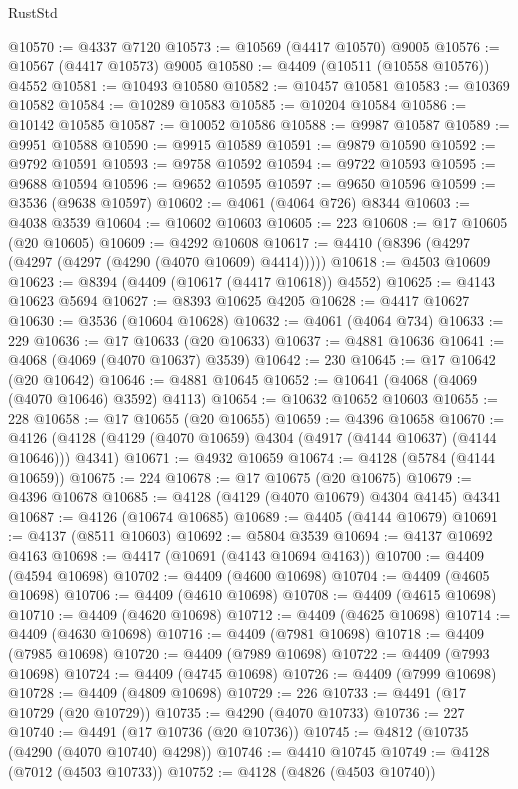 \begin{lexlean}{RustStd}
\begin{coremodule}
@10570 := @4337 @7120
@10573 := @10569 (@4417 @10570) @9005
@10576 := @10567 (@4417 @10573) @9005
@10580 := @4409 (@10511 (@10558 @10576)) @4552
@10581 := @10493 @10580
@10582 := @10457 @10581
@10583 := @10369 @10582
@10584 := @10289 @10583
@10585 := @10204 @10584
@10586 := @10142 @10585
@10587 := @10052 @10586
@10588 := @9987 @10587
@10589 := @9951 @10588
@10590 := @9915 @10589
@10591 := @9879 @10590
@10592 := @9792 @10591
@10593 := @9758 @10592
@10594 := @9722 @10593
@10595 := @9688 @10594
@10596 := @9652 @10595
@10597 := @9650 @10596
@10599 := @3536 (@9638 @10597)
@10602 := @4061 (@4064 @726) @8344
@10603 := @4038 @3539
@10604 := @10602 @10603
@10605 := 223
@10608 := @17 @10605 (@20 @10605)
@10609 := @4292 @10608
@10617 := @4410 (@8396 (@4297 (@4297 (@4297 (@4290 (@4070 @10609) @4414)))))
@10618 := @4503 @10609
@10623 := @8394 (@4409 (@10617 (@4417 @10618)) @4552)
@10625 := @4143 @10623 @5694
@10627 := @8393 @10625 @4205
@10628 := @4417 @10627
@10630 := @3536 (@10604 @10628)
@10632 := @4061 (@4064 @734)
@10633 := 229
@10636 := @17 @10633 (@20 @10633)
@10637 := @4881 @10636
@10641 := @4068 (@4069 (@4070 @10637) @3539)
@10642 := 230
@10645 := @17 @10642 (@20 @10642)
@10646 := @4881 @10645
@10652 := @10641 (@4068 (@4069 (@4070 @10646) @3592) @4113)
@10654 := @10632 @10652 @10603
@10655 := 228
@10658 := @17 @10655 (@20 @10655)
@10659 := @4396 @10658
@10670 := @4126 (@4128 (@4129 (@4070 @10659) @4304 (@4917 (@4144 @10637) (@4144 @10646))) @4341)
@10671 := @4932 @10659
@10674 := @4128 (@5784 (@4144 @10659))
@10675 := 224
@10678 := @17 @10675 (@20 @10675)
@10679 := @4396 @10678
@10685 := @4128 (@4129 (@4070 @10679) @4304 @4145) @4341
@10687 := @4126 (@10674 @10685)
@10689 := @4405 (@4144 @10679)
@10691 := @4137 (@8511 @10603)
@10692 := @5804 @3539
@10694 := @4137 @10692 @4163
@10698 := @4417 (@10691 (@4143 @10694 @4163))
@10700 := @4409 (@4594 @10698)
@10702 := @4409 (@4600 @10698)
@10704 := @4409 (@4605 @10698)
@10706 := @4409 (@4610 @10698)
@10708 := @4409 (@4615 @10698)
@10710 := @4409 (@4620 @10698)
@10712 := @4409 (@4625 @10698)
@10714 := @4409 (@4630 @10698)
@10716 := @4409 (@7981 @10698)
@10718 := @4409 (@7985 @10698)
@10720 := @4409 (@7989 @10698)
@10722 := @4409 (@7993 @10698)
@10724 := @4409 (@4745 @10698)
@10726 := @4409 (@7999 @10698)
@10728 := @4409 (@4809 @10698)
@10729 := 226
@10733 := @4491 (@17 @10729 (@20 @10729))
@10735 := @4290 (@4070 @10733)
@10736 := 227
@10740 := @4491 (@17 @10736 (@20 @10736))
@10745 := @4812 (@10735 (@4290 (@4070 @10740) @4298))
@10746 := @4410 @10745
@10749 := @4128 (@7012 (@4503 @10733))
@10752 := @4128 (@4826 (@4503 @10740))

\end{coremodule}
\end{lexlean}

